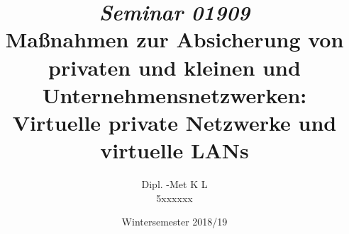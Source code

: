\documentclass[11pt, a4paper, chapterprefix=false]{scrreprt}
\begin{document}
	
	\begin{titlepage}
	\author{Dipl. -Met K L \\ 5xxxxxx} 
	\title{\textit{Seminar 01909}\\ Maßnahmen zur Absicherung von privaten und kleinen und Unternehmensnetzwerken: \\ Virtuelle private Netzwerke und virtuelle LANs } 
	\date{Wintersemester 2018/19} 
	\maketitle
	\end{titlepage}
	\newpage
	
	
	\tableofcontents
	
	\setcounter{page}{1}
	
	
	
	
	
	
	
	
	
	
	
	\appendix
	
	
	

	
\end{document}
